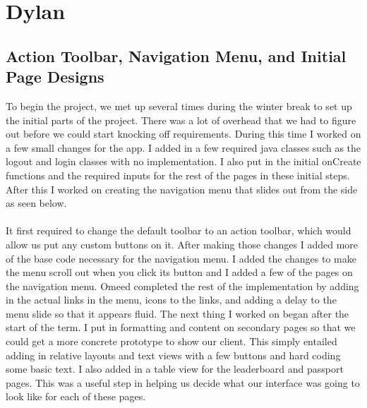 \documentclass[draftclsnofoot, onecolumn, 10pt, compsoc]{IEEEtran}
\begin{document}
   \section{Dylan}
      \subsection{Action Toolbar, Navigation Menu, and Initial Page Designs}
         To begin the project, we met up several times during the winter break to set up the initial parts of the project. There was a lot of overhead that we had to figure out before we could start knocking off requirements. During this time I worked on a few small changes for the app. I added in a few required java classes such as the logout and login classes with no implementation. I also put in the initial onCreate functions and the required inputs for the rest of the pages in these initial steps. After this I worked on creating the navigation menu that slides out from the side as seen below. \\ \\

         It first required to change the default toolbar to an action toolbar, which would allow us put any custom buttons on it. After making those changes I added more of the base code necessary for the navigation menu. I added the changes to make the menu scroll out when you click its button and I added a few of the pages on the navigation menu. Omeed completed the rest of the implementation by adding in the actual links in the menu, icons to the links, and adding a delay to the menu slide so that it appears fluid. The next thing I worked on began after the start of the term. I put in formatting and content on secondary pages so that we could get a more concrete prototype to show our client. This simply entailed adding in relative layouts and text views with a few buttons and hard coding some basic text. I also added in a table view for the leaderboard and passport pages. This was a useful step in helping us decide what our interface was going to look like for each of these pages.
\end{document}
